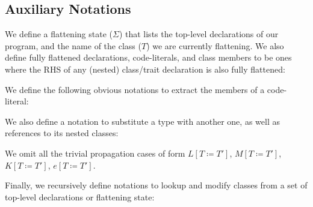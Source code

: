 \subsection{Auxiliary Notations}
We define a flattening state ($\Sigma$) that lists the top-level declarations of our program, and the name of the class ($T$) we are currently flattening. We also define fully flattened declarations, code-literals, and class members to be ones where the RHS of any (nested) class/trait declaration is also fully flattened:

\begin{grammar}
	\midrule
\end{grammar}



We define the following obvious notations to extract the members of a code-literal:

\begin{defs}
\end{defs}

We also define a notation to substitute a type with another one, as well as references to its nested classes:

\begin{defs}
\end{defs}
We omit all the trivial propagation cases of form $L[T \coloneqq T']$, $M[T \coloneqq T']$, $K[T \coloneqq T']$, $e[T \coloneqq T']$.


Finally, we recursively define notations to lookup and modify classes from a set of top-level declarations or flattening state:

\begin{defs}
\end{defs}

